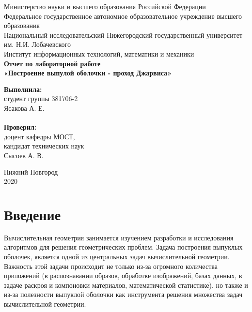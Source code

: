 \documentclass{article}
\begin{document}
\begin{titlepage}

\begin{center}
Министерство науки и высшего образования Российской Федерации \\
\vspace{5mm}
Федеральное государственное автономное образовательное учреждение высшего образования \\
Национальный исследовательский Нижегородский государственный университет им. Н.И. Лобачевского \\
\vspace{1cm}
Институт информационных технологий, математики и механики \\
\vspace{5cm}
\textbf{\large Отчет по лабораторной работе} \\
\vspace{8mm}
\textbf{\Large «Построение выпулой оболочки - проход Джарвиса»} \\
\end{center}

\vspace{3cm}

\newbox{\lbox}
\newlength{\maxl}
\setlength{\maxl}{\wd\lbox}
\hfill\parbox{7cm}{
\hspace*{5cm}\hspace*{-5cm}\textbf{Выполнила:} \\ студент группы 381706-2 \\ Ясакова А. Е.\\
\\
\hspace*{5cm}\hspace*{-5cm}\textbf{Проверил:}\\ доцент кафедры МОСТ, \\ кандидат технических наук \\ Сысоев А. В.
}

\vspace{\fill}

\begin{center} 
Нижний Новгород \\ 2020
\end{center}
\end{titlepage}

\setcounter{page}{2}

\tableofcontents

\newpage

\section{Введение}
Вычислительная геометрия занимается изучением разработки и исследования алгоритмов для решения геометрических проблем. Задача построения выпуклых оболочек, является одной из центральных задач вычислительной геометрии. Важность этой задачи происходит не только из-за огромного количества приложений (в распознавании образов, обработке изображений, базах данных, в задаче раскроя и компоновки материалов, математической статистике), но также и из-за полезности выпуклой оболочки как инструмента решения множества задач вычислительной геометрии.
\end{document}
